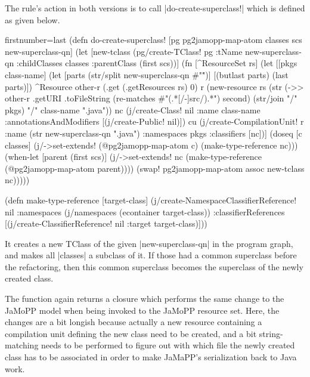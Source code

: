 \documentclass[submission]{eptcs}
\newcommand{\code}{\clojureinline}
\begin{document}
The rule's action in both versions is to call \code|do-create-superclass!|
which is defined as given below.

\begin{clojurecode*}{firstnumber=last}
(defn do-create-superclass! [pg pg2jamopp-map-atom classes scs new-superclass-qn]
  (let [new-tclass (pg/create-TClass! pg {:tName new-superclass-qn
                                          :childClasses classes
                                          :parentClass (first scs)})]
    (fn [^ResourceSet rs]
      (let [[pkgs class-name] (let [parts (str/split new-superclass-qn #"\.")]
                                [(butlast parts) (last parts)])
            ^Resource other-r (.get (.getResources rs) 0)
            r (new-resource rs (str (->> other-r .getURI .toFileString
                                         (re-matches #"(.*[/-]src/).*")
                                         second)
                                    (str/join "/" pkgs) "/" class-name ".java"))
            nc (j/create-Class! nil {:name class-name
                                     :annotationsAndModifiers [(j/create-Public! nil)]})
            cu (j/create-CompilationUnit! r {:name (str new-superclass-qn ".java")
                                             :namespaces  pkgs
                                             :classifiers [nc]})]
        (doseq [c classes]
          (j/->set-extends! (@pg2jamopp-map-atom c) (make-type-reference nc)))
        (when-let [parent (first scs)]
          (j/->set-extends! nc (make-type-reference (@pg2jamopp-map-atom parent))))
        (swap! pg2jamopp-map-atom assoc new-tclass nc)))))

(defn make-type-reference [target-class]
  (j/create-NamespaceClassifierReference!
   nil {:namespaces (j/namespaces (econtainer target-class))
        :classifierReferences [(j/create-ClassifierReference!
                                nil {:target target-class})]}))
\end{clojurecode*}

It creates a new \textsf{TClass} of the given \code|new-superclass-qn| in the
program graph, and makes all \code|classes| a subclass of it.  If those had a
common superclass before the refactoring, then this common superclass becomes
the superclass of the newly created class.

The function again returns a closure which performs the same change to the
JaMoPP model when being invoked to the JaMoPP resource set.  Here, the changes
are a bit longish because actually a new resource containing a compilation unit
defining the new class need to be created, and a bit string-matching needs to
be performed to figure out with which file the newly created class has to be
associated in order to make JaMaPP's serialization back to Java work.
\end{document}
